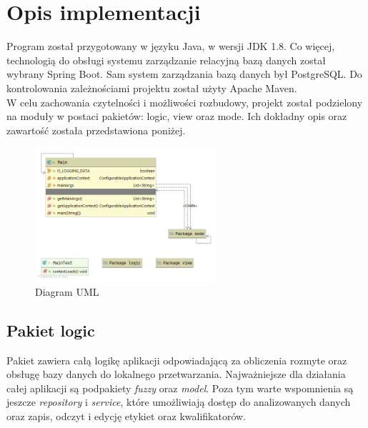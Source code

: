 \documentclass{classrep}
\begin{document}
    \section{Opis implementacji} {
        Program został przygotowany w języku Java, w wersji JDK 1.8. Co więcej, technologią
        do obsługi systemu zarządzanie relacyjną bazą danych został wybrany Spring Boot.
        Sam system zarządzania bazą danych był PostgreSQL. Do kontrolowania zależnościami
        projektu został użyty Apache Maven.\\
        W celu zachowania czytelności i możliwości rozbudowy, projekt został podzielony na
        moduły w postaci pakietów: logic, view oraz mode. Ich dokładny opis oraz zawartość
        została przedstawiona poniżej.

        \begin{figure}[!htbp]
            \centering
            \includegraphics[width=0.6\textwidth]{img/uml/task2.png}
            \caption{Diagram UML}
        \end{figure}
        \FloatBarrier

        \subsection{Pakiet logic} {
            Pakiet zawiera całą logikę aplikacji odpowiadającą za obliczenia rozmyte oraz obsługę bazy danych do
            lokalnego przetwarzania. Najważniejsze dla działania całej aplikacji są podpakiety \emph{fuzzy} oraz
            \emph{model}. Poza tym warte wspomnienia są jeszcze \emph{repository} i \emph{service}, które umożliwiają
            dostęp do analizowanych danych oraz zapis, odczyt i edycję etykiet oraz kwalifikatorów.

}}
\end{document}
